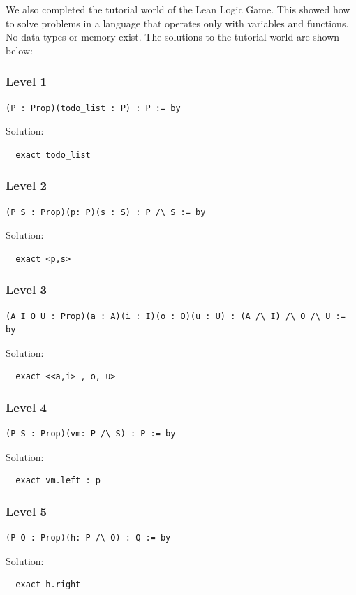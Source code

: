 \documentclass{article}
\theoremstyle{theorem}
\theoremstyle{definition}
\theoremstyle{remark}
\begin{document}
We also completed the tutorial world of the Lean Logic Game. This showed how to solve problems in a language
that operates only with variables and functions. No data types or memory exist. The solutions to the tutorial 
world are shown below:
\subsubsection*{Level 1}
\begin{lstlisting}
(P : Prop)(todo_list : P) : P := by
\end{lstlisting}
Solution:
\begin{lstlisting}
  exact todo_list
\end{lstlisting}
\subsubsection*{Level 2}
\begin{lstlisting}
(P S : Prop)(p: P)(s : S) : P /\ S := by
\end{lstlisting}
Solution:
\begin{lstlisting}
  exact <p,s>
\end{lstlisting}
\subsubsection*{Level 3}
\begin{lstlisting}
(A I O U : Prop)(a : A)(i : I)(o : O)(u : U) : (A /\ I) /\ O /\ U := by
\end{lstlisting}
Solution:
\begin{lstlisting}
  exact <<a,i> , o, u>
\end{lstlisting}
\subsubsection*{Level 4}
\begin{lstlisting}
(P S : Prop)(vm: P /\ S) : P := by
\end{lstlisting}
Solution:
\begin{lstlisting}
  exact vm.left : p
\end{lstlisting}
\subsubsection*{Level 5}
\begin{lstlisting}
(P Q : Prop)(h: P /\ Q) : Q := by
\end{lstlisting}
Solution:
\begin{lstlisting}
  exact h.right
\end{lstlisting}
\end{document}
